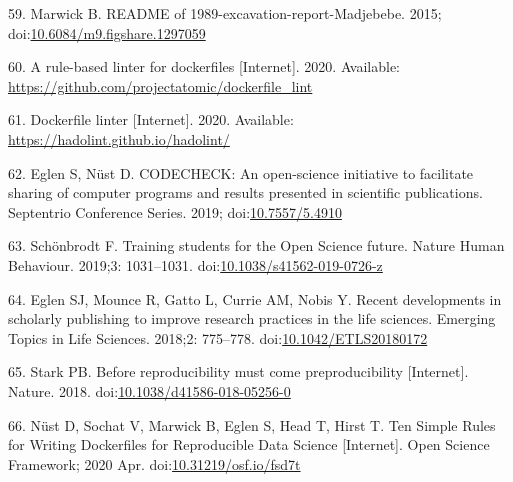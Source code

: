 \documentclass[10pt,letterpaper]{article}
\begin{document}
\leavevmode\hypertarget{ref-marwick_readme_2015}{}%
59. Marwick B. README of 1989-excavation-report-Madjebebe. 2015;
doi:\href{https://doi.org/10.6084/m9.figshare.1297059}{10.6084/m9.figshare.1297059}

\leavevmode\hypertarget{ref-dockerfile-lint}{}%
60. A rule-based linter for dockerfiles {[}Internet{]}. 2020. Available:
\url{https://github.com/projectatomic/dockerfile_lint}

\leavevmode\hypertarget{ref-hadolint}{}%
61. Dockerfile linter {[}Internet{]}. 2020. Available:
\url{https://hadolint.github.io/hadolint/}

\leavevmode\hypertarget{ref-eglen_codecheck_2019}{}%
62. Eglen S, Nüst D. CODECHECK: An open-science initiative to facilitate
sharing of computer programs and results presented in scientific
publications. Septentrio Conference Series. 2019;
doi:\href{https://doi.org/10.7557/5.4910}{10.7557/5.4910}

\leavevmode\hypertarget{ref-schonbrodt_training_2019}{}%
63. Schönbrodt F. Training students for the Open Science future. Nature
Human Behaviour. 2019;3: 1031--1031.
doi:\href{https://doi.org/10.1038/s41562-019-0726-z}{10.1038/s41562-019-0726-z}

\leavevmode\hypertarget{ref-eglen_recent_2018}{}%
64. Eglen SJ, Mounce R, Gatto L, Currie AM, Nobis Y. Recent developments
in scholarly publishing to improve research practices in the life
sciences. Emerging Topics in Life Sciences. 2018;2: 775--778.
doi:\href{https://doi.org/10.1042/ETLS20180172}{10.1042/ETLS20180172}

\leavevmode\hypertarget{ref-stark_before_2018}{}%
65. Stark PB. Before reproducibility must come preproducibility
{[}Internet{]}. Nature. 2018.
doi:\href{https://doi.org/10.1038/d41586-018-05256-0}{10.1038/d41586-018-05256-0}

\leavevmode\hypertarget{ref-nust_ten_2020}{}%
66. Nüst D, Sochat V, Marwick B, Eglen S, Head T, Hirst T. Ten Simple
Rules for Writing Dockerfiles for Reproducible Data Science
{[}Internet{]}. Open Science Framework; 2020 Apr.
doi:\href{https://doi.org/10.31219/osf.io/fsd7t}{10.31219/osf.io/fsd7t}

\nolinenumbers
\end{document}
